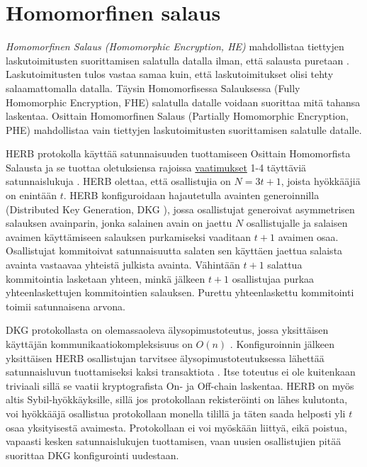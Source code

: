 \section{Homomorfinen salaus}

\textit{Homomorfinen Salaus (Homomorphic Encryption, HE)} mahdollistaa tiettyjen laskutoimitusten suorittamisen salatulla datalla ilman, että salausta puretaan \cite{alma9928100443506253}. Laskutoimitusten tulos vastaa samaa kuin, että laskutoimitukset olisi tehty salaamattomalla datalla. Täysin Homomorfisessa Salauksessa (Fully Homomorphic Encryption, FHE) salatulla datalle voidaan suorittaa mitä tahansa laskentaa. Osittain Homomorfinen Salaus (Partially Homomorphic Encryption, PHE) mahdollistaa vain tiettyjen laskutoimitusten suorittamisen salatulle datalle.

HERB protokolla käyttää satunnaisuuden tuottamiseen Osittain Homomorfista Salausta ja se tuottaa oletuksiensa rajoissa \hyperref[vaatimukset]{vaatimukset} 1-4 täyttäviä satunnaislukuja \cite{cherniaeva2019homomorphic}. HERB olettaa, että osallistujia on $N=3t+1$, joista hyökkääjiä on enintään $t$. HERB konfiguroidaan hajautetulla avainten generoinnilla (Distributed Key Generation, DKG \cite{pedersen1991threshold}), jossa osallistujat generoivat asymmetrisen salauksen avainparin, jonka salainen avain on jaettu $N$ osallistujalle ja salaisen avaimen käyttämiseen salauksen purkamiseksi vaaditaan $t+1$ avaimen osaa. Osallistujat kommitoivat satunnaisuutta salaten sen käyttäen jaettua salaista avainta vastaavaa yhteistä julkista avainta. Vähintään $t+1$ salattua kommitointia lasketaan yhteen, minkä jälkeen $t+1$ osallistujaa purkaa yhteenlaskettujen kommitointien salauksen. Purettu yhteenlaskettu kommitointi toimii satunnaisena arvona. 

DKG protokollasta on olemassaoleva älysopimustoteutus, jossa yksittäisen käyttäjän kommunikaatiokompleksisuus on $O(n)$ \cite{schindler2019ethdkg}. Konfiguroinnin jälkeen yksittäisen HERB osallistujan tarvitsee älysopimustoteutuksessa lähettää satunnaisluvun tuottamiseksi kaksi transaktiota \cite{cherniaeva2019homomorphic}. Itse toteutus ei ole kuitenkaan triviaali sillä se vaatii kryptografista On- ja Off-chain laskentaa. HERB on myös altis Sybil-hyökkäyksille, sillä jos protokollaan rekisteröinti on lähes kulutonta, voi hyökkääjä osallistua protokollaan monella tilillä ja täten saada helposti yli $t$ osaa yksityisestä avaimesta. Protokollaan ei voi myöskään liittyä, eikä poistua, vapaasti kesken satunnaislukujen tuottamisen, vaan uusien osallistujien pitää suorittaa DKG konfigurointi uudestaan. 

